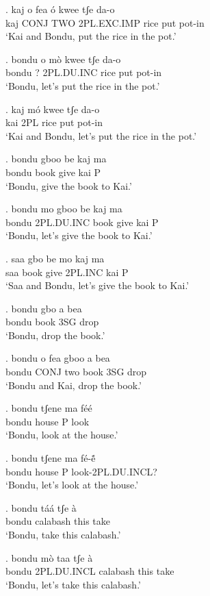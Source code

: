 \documentclass{assets/fieldnotes}
\begin{document}
{\exg. kaj o fea ó kwee tʃe da-o \\
kaj CONJ TWO 2PL.EXC.IMP rice put pot-in \\
`Kai and Bondu, put the rice in the pot.'


\exg. bondu o mò kwee tʃe da-o \\
bondu ? 2PL.DU.INC rice put pot-in \\
`Bondu, let's put the rice in the pot.'

\exg. kaj mó kwee tʃe da-o \\
kai 2PL rice put pot-in \\
`Kai and Bondu, let's put the rice in the pot.'


\exg. bondu gboo be kaj ma \\
bondu book give kai P \\
`Bondu, give the book to Kai.'

\exg. bondu mo gboo be kaj ma \\
bondu 2PL.DU.INC book give kai P \\
`Bondu, let's give the book to Kai.'

\exg. saa gbo be mo kaj ma \\
saa book give 2PL.INC kai P \\
`Saa and Bondu, let's give the book to Kai.'


 

\exg. bondu gbo a bea \\
bondu book 3SG drop \\
`Bondu, drop the book.'

\exg. bondu o fea gboo a bea \\
bondu CONJ two book 3SG drop \\
`Bondu and Kai, drop the book.'

\exg. bondu tʃene ma féé \\
bondu house P look \\
`Bondu, look at the house.'

\exg. bondu tʃene ma fé-ẽ́\\
bondu house P look-2PL.DU.INCL? \\
`Bondu, let's look at the house.'

\exg. bondu táá tʃe à \\
bondu calabash this take \\
`Bondu, take this calabash.'

\exg. bondu mò taa tʃe à \\
bondu 2PL.DU.INCL  calabash this take \\
`Bondu, let's take this calabash.'

}
\end{document}
